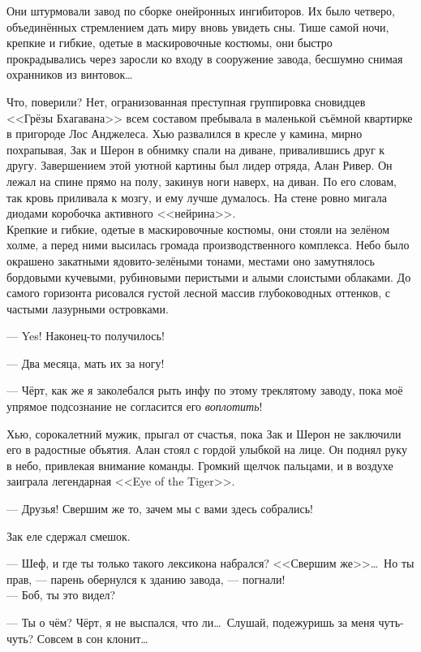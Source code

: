 \documentclass[openany, oneside]{book}
\begin{document}
Они штурмовали завод по сборке онейронных ингибиторов. Их было четверо, объединённых стремлением дать миру вновь увидеть сны. Тише самой ночи, крепкие и гибкие, одетые в маскировочные костюмы, они быстро прокрадывались через заросли ко входу в сооружение завода, бесшумно снимая охранников из винтовок\dots

Что, поверили? Нет, огранизованная преступная группировка сновидцев <<Грёзы Бхагавана>> всем составом пребывала в маленькой съёмной квартирке в пригороде Лос Анджелеса. Хью развалился в кресле у камина, мирно похрапывая, Зак и Шерон в обнимку спали на диване, привалившись друг к другу. Завершением этой уютной картины был лидер отряда, Алан Ривер. Он лежал на спине прямо на полу, закинув ноги наверх, на диван. По его словам, так кровь приливала к мозгу, и ему лучше думалось. На стене ровно мигала диодами коробочка активного <<нейрина>>.\\

Крепкие и гибкие, одетые в маскировочные костюмы, они стояли на зелёном холме, а перед ними высилась громада производственного комплекса. Небо было окрашено закатными ядовито-зелёными тонами, местами оно замутнялось бордовыми кучевыми, рубиновыми перистыми и алыми слоистыми облаками. До самого горизонта рисовался густой лесной массив глубоководных оттенков, с частыми лазурными островками.

--- Yes! Наконец-то получилось!

--- Два месяца, мать их за ногу!

--- Чёрт, как же я заколебался рыть инфу по этому треклятому заводу, пока моё упрямое подсознание не согласится его \textit{воплотить}!

Хью, сорокалетний мужик, прыгал от счастья, пока Зак и Шерон не заключили его в радостные объятия. Алан стоял с гордой улыбкой на лице. Он поднял руку в небо, привлекая внимание команды. Громкий щелчок пальцами, и в воздухе заиграла легендарная <<Eye of the Tiger>>.

--- Друзья! Свершим же то, зачем мы с вами здесь собрались!

Зак еле сдержал смешок.

--- Шеф, и где ты только такого лексикона набрался? <<Свершим же>>\dots \ Но ты прав, --- парень обернулся к зданию завода, --- погнали!\\

--- Боб, ты это видел?

--- Ты о чём? Чёрт, я не выспался, что ли\dots \ Слушай, подежуришь за меня чуть-чуть? Совсем в сон клонит\dots
\end{document}
